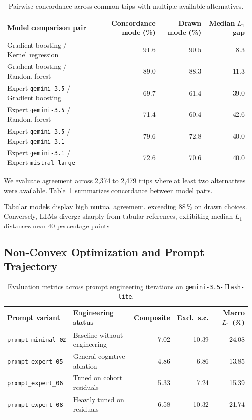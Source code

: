 \begin{table}[tp]
  \caption{Pairwise concordance across common trips with multiple available alternatives.}
  \label{tab-concordance}
  \begin{tabular}{lrrr}
    \toprule
    Model comparison pair & Concordance mode (\%) & Drawn mode (\%) & Median $L_1$ gap \\
    \midrule
    Gradient boosting / Kernel regression & 91.6 & 90.5 & 8.3 \\
    Gradient boosting / Random forest     & 89.0 & 88.3 & 11.3 \\
    \midrule
    Expert \texttt{gemini-3.5} / Gradient boosting & 69.7 & 61.4 & 39.0 \\
    Expert \texttt{gemini-3.5} / Random forest     & 71.4 & 60.4 & 42.6 \\
    Expert \texttt{gemini-3.5} / Expert \texttt{gemini-3.1}    & 79.6 & 72.8 & 40.0 \\
    Expert \texttt{gemini-3.1} / Expert \texttt{mistral-large} & 72.6 & 70.6 & 40.0 \\
    \bottomrule
  \end{tabular}
\end{table}

We evaluate agreement across 2{,}374 to 2{,}479 trips where at least two alternatives were available. Table~\ref{tab-concordance} summarizes concordance between model pairs.

Tabular models display high mutual agreement, exceeding 88\,\% on drawn choices. Conversely, LLMs diverge sharply from tabular references, exhibiting median $L_1$ distances near 40 percentage points.



\subsection{Non-Convex Optimization and Prompt Trajectory}

\begin{table}[tp]
  \caption{Evaluation metrics across prompt engineering iterations on \texttt{gemini-3.5-flash-lite}.}
  \label{tab-prompt-traj}
  \begin{tabular}{llrrr}
    \toprule
    Prompt variant & Engineering status & Composite & Excl.\ s.c. & Macro $L_1$ (\%) \\
    \midrule
    \texttt{prompt\_minimal\_02} & Baseline without engineering   & 7.02 & 10.39 & 24.08 \\
    \texttt{prompt\_expert\_05}  & General cognitive ablation     & 4.86 &  6.86 & 13.85 \\
    \texttt{prompt\_expert\_06}  & Tuned on cohort residuals      & 5.33 &  7.24 & 15.39 \\
    \texttt{prompt\_expert\_08}  & Heavily tuned on residuals     & 6.58 & 10.32 & 21.74 \\
    \bottomrule
  \end{tabular}
\end{table}

